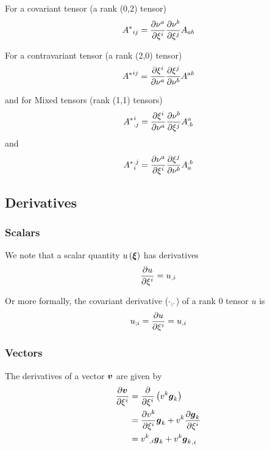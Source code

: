For a covariant tensor (a rank (0,2) tensor)
\begin{equation}
  {A^{*}}_{ij}= \dfrac{\partial \nu^{a}}{\partial \xi^{i}}  \dfrac{\partial \nu^{b}}{\partial \xi^{j}} A_{ab} 
\end{equation}

For a contravariant tensor (a rank (2,0) tensor)
\begin{equation}
  {A^{*}}^{ij}= \dfrac{\partial \xi^{i}}{\partial \nu^{a}}  \dfrac{\partial \xi^{j}}{\partial \nu^{b}} A^{ab}
\end{equation}

and for Mixed tensors (rank (1,1) tensors)
\begin{equation}
  {A^{*}}^{i}_{.j}= \dfrac{\partial \xi^{i}}{\partial \nu^{a}}  \dfrac{\partial \nu^{b}}{\partial \xi^{j}} A^{a}_{.b}
\end{equation}
and
\begin{equation}
  {A^{*}}_{i}^{.j}= \dfrac{\partial \nu^{a}}{\partial \xi^{i}}  \dfrac{\partial \xi^{j}}{\partial \nu^{b}} A_{a}^{.b}
\end{equation}

\subsection{Derivatives}
\label{subsec:function derivatives}

\subsubsection{Scalars}

We note that a scalar quantity $\fnof{u}{\vect{\xi}}$ has derivatives
\begin{equation}
   \dfrac{\partial u}{\partial \xi^{i}} = {u}_{,i} 
\end{equation}

Or more formally, the covariant derivative ($ {\cdot}_{;\cdot} $) of a
rank 0 tensor $u$ is
\begin{equation}
   {u}_{;i} = \dfrac{\partial u}{\partial \xi^{i}} = {u}_{,i} 
\end{equation}

\subsubsection{Vectors}

The derivatives of a vector $\vect{v}$ are given by
\begin{equation}
  \begin{split}
    \delby{\vect{v}}{\xi^{i}} &=
    \delby{}{\xi^{i}}\pbrac{v^{k}\vect{g}_{k}} \\
    &= \delby{v^{k}}{\xi^{i}}\vect{g}_{k}+v^{k}\delby{\vect{g}_{k}}{\xi^{i}} \\
    &= \partialderiv{v^{k}}{i}\vect{g}_{k}+v^{k}\partialderiv{\vect{g}_{k}}{i}
  \end{split}
\end{equation}

